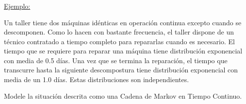 \documentclass[ 10pt, xcolor = dvipsnames]{beamer}
\begin{document}
\begin{frame}[allowframebreaks]
\frametitle{\insertsubsection}

\underline{Ejemplo:}

Un taller tiene dos m\'aquinas id\'enticas en operaci\'on continua excepto cuando se descomponen. Como lo hacen con bastante frecuencia, el taller dispone de un t\'ecnico contratado a tiempo completo para repararlas cuando es necesario. \linebreak El tiempo que se requiere para reparar una m\'aquina tiene distribuci\'on exponencial con media de 0.5 d\'ias. Una vez que se termina la reparaci\'on, el tiempo que transcurre hasta la siguiente descompostura tiene distribuci\'on exponencial con media de un 1.0 d\'ias. Estas distribuciones son independientes. 

Modele la situaci\'on descrita como una Cadena de Markov en Tiempo Continuo. 

\end{frame}
\end{document}
